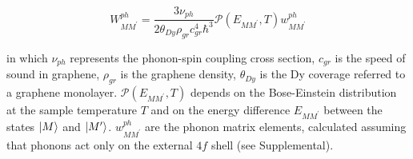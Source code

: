 \documentclass[
reprint,amsmath,amssymb,aps]{revtex4-2}
\begin{document}
\begin{equation}
    \label{eq:phonon_rates}
    W_{MM^{\prime}}^{ph}=\dfrac{3 \nu_{ph}}{2\theta_{Dy}\rho_{gr}c_{gr}^4 \hbar^3} \mathcal{P} \left( E_{MM^{\prime}}, T \right) w^{ph}_{MM^{\prime}}
\end{equation}

in which $\nu_{ph}$ represents the phonon-spin coupling cross section, $c_{gr}$ is the speed of sound in graphene, $\rho_{gr}$ is the graphene density, $\theta_{Dy}$ is the Dy coverage referred to a graphene monolayer. $\mathcal{P}\left( E_{MM^{\prime}}, T \right)$ depends on the Bose-Einstein distribution at the sample temperature $T$ and on the energy difference $E_{MM^{\prime}}$ between the states $\ket{M}$ and $\ket{M^{\prime}}$. $w^{ph}_{MM^{\prime}}$ are the phonon matrix elements, calculated assuming that phonons act only on the external $4f$ shell (see Supplemental).
\end{document}
